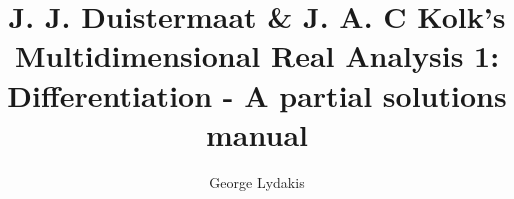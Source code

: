 \documentclass[a4paper, 11pt]{book}
\begin{document}
\title{J. J. Duistermaat \& J. A. C Kolk's Multidimensional Real Analysis 1: Differentiation - A partial solutions manual}
\author{George Lydakis}
\maketitle

\setcounter{tocdepth}{2}
\tableofcontents


%
%


\end{document}
